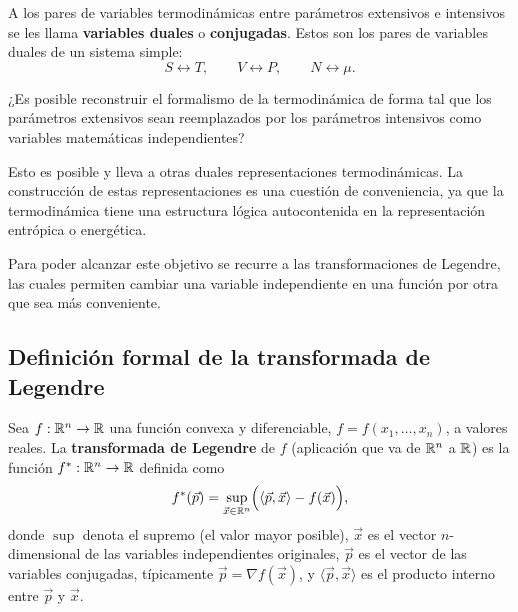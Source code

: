 A los pares de variables termodinámicas entre parámetros extensivos e intensivos se les llama
\textbf{variables duales} o \textbf{conjugadas}. Estos son los pares de variables duales de un sistema
simple:
\begin{equation*}
  S\leftrightarrow T,\qquad V\leftrightarrow P,\qquad N\leftrightarrow\mu.
\end{equation*}

¿Es posible reconstruir el formalismo de la termodinámica de forma tal que los parámetros extensivos
sean reemplazados por los parámetros intensivos como variables matemáticas independientes?

Esto es posible y lleva a otras duales representaciones termodinámicas. La construcción de estas
representaciones es una cuestión de conveniencia, ya que la termodinámica tiene una estructura
lógica autocontenida en la representación entrópica o energética.

Para poder alcanzar este objetivo se recurre a las transformaciones de Legendre, las cuales permiten
cambiar una variable independiente en una función por otra que sea más conveniente.

\subsection*{Definición formal de la transformada de Legendre}

\begin{definicion}
  Sea $f:\mathbb{R}^{n}\to\mathbb{R}$ una función convexa y diferenciable, $f=f(x_1,\dots,x_n)$, a valores reales. La
  \textbf{transformada de Legendre} de $f$ (aplicación que va de $\mathbb{R}^{n}$ a $\mathbb{R}$) es la función
  $f^{*}:\mathbb{R}^{n}\to\mathbb{R}$ definida como
  \begin{equation*}
    f^{*}(\vec{p})=\sup_{\vec{x}\in\mathbb{R}^{n}}\Bigl(\langle\vec{p},\vec{x}\rangle-f(\vec{x})\Bigr),
  \end{equation*}
  donde $\sup$ denota el supremo (el valor mayor posible), $\vec{x}$ es el vector $n$-dimensional de
  las variables independientes originales, $\vec{p}$ es el vector de las variables conjugadas,
  típicamente $\vec{p}=\nabla f(\vec{x})$, y $\langle\vec{p},\vec{x}\rangle$ es el producto interno
  entre $\vec{p}$ y $\vec{x}$.
\end{definicion}

